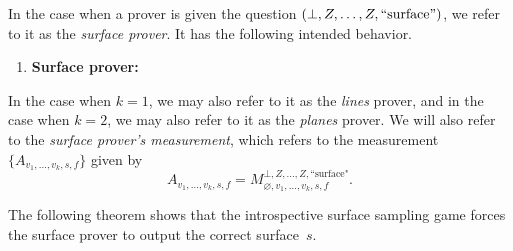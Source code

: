 \begin{notation}
In the case when a prover is given the question $(\bot, Z, \ldots, Z, \mathrm{``surface"})$,
we refer to it as the \emph{surface prover}.  
It has the following intended behavior.
\begin{enumerate}
\item \textbf{Surface prover:}  
\end{enumerate}
In the case when $k = 1$, we may also refer to it as the \emph{lines} prover,
and in the case when $k = 2$, we may also refer to it as the \emph{planes} prover.
We will also refer to the \emph{surface prover's measurement},
which refers to the measurement $\{A_{v_1, \ldots, v_k, s, f}\}$ given by
\[A_{v_1, \ldots, v_k, s, f} = M^{\bot, Z, \dots, Z,
    \text{``surface"}}_{\varnothing, v_1, \dots, v_k, s,
    f}.\]
\end{notation}

The following theorem shows that the introspective surface sampling game
forces the surface prover to output the correct surface~$s$. 

